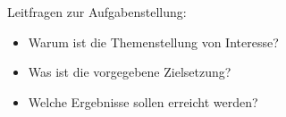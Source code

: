 \renewcommand*{\authorOfNextLines}{HTL Weiz}
Leitfragen zur Aufgabenstellung:
\begin{itemize}
	\item Warum ist die Themenstellung von Interesse?
	\item Was ist die vorgegebene Zielsetzung?
	\item Welche Ergebnisse sollen erreicht werden?
\end{itemize}
